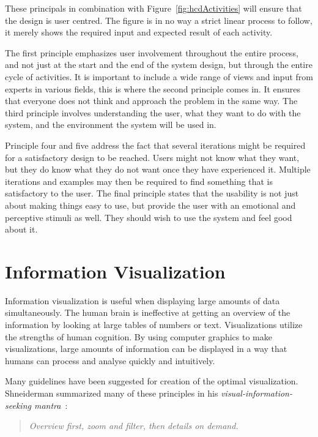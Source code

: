 These principals in combination with Figure~\ref{fig:hcdActivities} will ensure that the design is user centred. The figure is in no way a strict linear process to follow, it merely shows the required input and expected result of each activity.

The first principle emphasizes user involvement throughout the entire process, and not just at the start and the end of the system design, but through the entire cycle of activities. It is important to include a wide range of views and input from experts in various fields, this is where the second principle comes in. It ensures that everyone does not think and approach the problem in the same way. The third principle involves understanding the user, what they want to do with the system, and the environment the system will be used in.

Principle four and five address the fact that several iterations might be required for a satisfactory design to be reached. Users might not know what they want, but they do know what they do not want once they have experienced it. Multiple iterations and examples may then be required to find something that is satisfactory to the user. The final principle states that the usability is not just about making things easy to use, but provide the user with an emotional and perceptive stimuli as well. They should wish to use the system and feel good about it.

\section{Information Visualization}
Information visualization is useful when displaying large amounts of data simultaneously. The human brain is ineffective at getting an overview of the information by looking at large tables of numbers or text. Visualizations utilize the strengths of human cognition. By using computer graphics to make visualizations, large amounts of information can be displayed in a way that humans can process and analyse quickly and intuitively.

Many guidelines have been suggested for creation of the optimal visualization. Shneiderman summarized many of these principles in his \emph{visual-information-seeking mantra}~\cite{shneiderman}:

\vspace{-13pt}
\begin{quote}
\textit{Overview first, zoom and filter, then details on demand.}
\end{quote}

